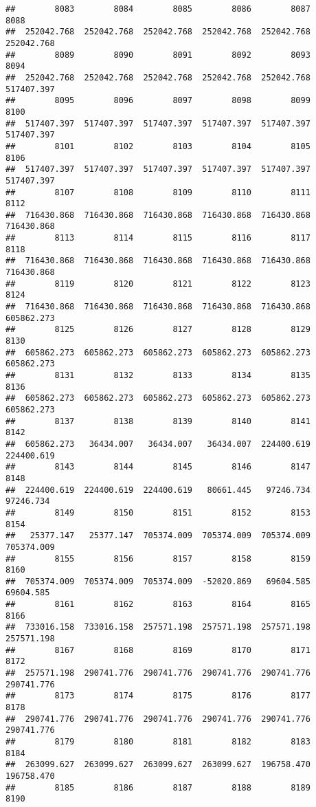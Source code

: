 \documentclass[
]{book}
\begin{document}
\begin{verbatim}
##        8083        8084        8085        8086        8087        8088 
##  252042.768  252042.768  252042.768  252042.768  252042.768  252042.768 
##        8089        8090        8091        8092        8093        8094 
##  252042.768  252042.768  252042.768  252042.768  252042.768  517407.397 
##        8095        8096        8097        8098        8099        8100 
##  517407.397  517407.397  517407.397  517407.397  517407.397  517407.397 
##        8101        8102        8103        8104        8105        8106 
##  517407.397  517407.397  517407.397  517407.397  517407.397  517407.397 
##        8107        8108        8109        8110        8111        8112 
##  716430.868  716430.868  716430.868  716430.868  716430.868  716430.868 
##        8113        8114        8115        8116        8117        8118 
##  716430.868  716430.868  716430.868  716430.868  716430.868  716430.868 
##        8119        8120        8121        8122        8123        8124 
##  716430.868  716430.868  716430.868  716430.868  716430.868  605862.273 
##        8125        8126        8127        8128        8129        8130 
##  605862.273  605862.273  605862.273  605862.273  605862.273  605862.273 
##        8131        8132        8133        8134        8135        8136 
##  605862.273  605862.273  605862.273  605862.273  605862.273  605862.273 
##        8137        8138        8139        8140        8141        8142 
##  605862.273   36434.007   36434.007   36434.007  224400.619  224400.619 
##        8143        8144        8145        8146        8147        8148 
##  224400.619  224400.619  224400.619   80661.445   97246.734   97246.734 
##        8149        8150        8151        8152        8153        8154 
##   25377.147   25377.147  705374.009  705374.009  705374.009  705374.009 
##        8155        8156        8157        8158        8159        8160 
##  705374.009  705374.009  705374.009  -52020.869   69604.585   69604.585 
##        8161        8162        8163        8164        8165        8166 
##  733016.158  733016.158  257571.198  257571.198  257571.198  257571.198 
##        8167        8168        8169        8170        8171        8172 
##  257571.198  290741.776  290741.776  290741.776  290741.776  290741.776 
##        8173        8174        8175        8176        8177        8178 
##  290741.776  290741.776  290741.776  290741.776  290741.776  290741.776 
##        8179        8180        8181        8182        8183        8184 
##  263099.627  263099.627  263099.627  263099.627  196758.470  196758.470 
##        8185        8186        8187        8188        8189        8190 

\end{verbatim}
\end{document}
